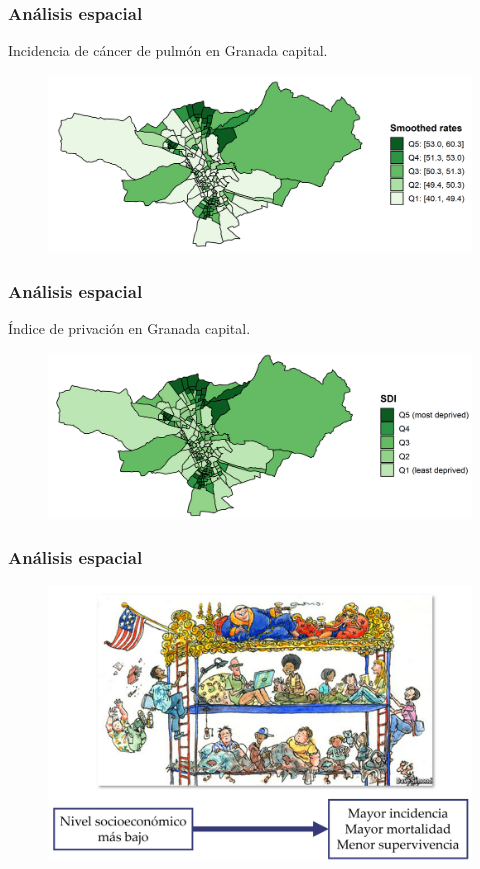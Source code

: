 \documentclass{beamer}
\begin{document}

\begin{frame}\frametitle{Análisis espacial}
	\centering Incidencia de cáncer de pulmón en Granada capital.
	\begin{figure}
		\centering
		\includegraphics[width=.9\textwidth]{images/03_lung_ebs_zoom.png}
	\end{figure}
\end{frame}


\begin{frame}\frametitle{Análisis espacial}
	\centering Índice de privación en Granada capital.
	\begin{figure}
		\centering
		\includegraphics[width=.9\textwidth]{images/maps_DI_zoom.png}
	\end{figure}
\end{frame}


\begin{frame}\frametitle{Análisis espacial}
	\begin{figure}
		\centering
		\includegraphics[width=.9\textwidth]{images/nivel_socioeconomico.png}
	\end{figure}
\end{frame}
\end{document}
